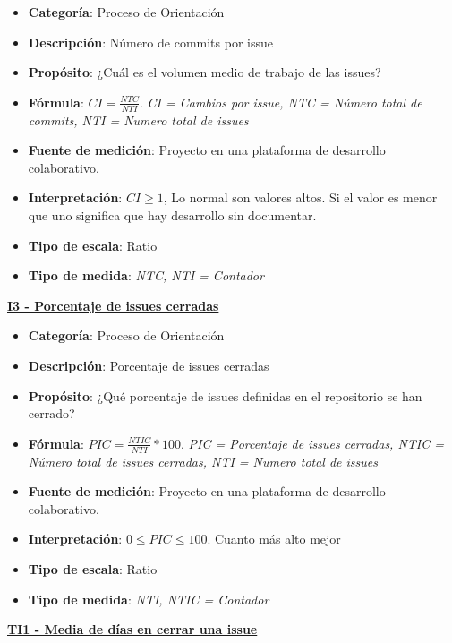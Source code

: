 \begin{itemize}
	\item \textbf{Categoría}: Proceso de Orientación
	\item \textbf{Descripción}: Número de commits por issue
	\item \textbf{Propósito}: ¿Cuál es el volumen medio de trabajo de las issues?
	\item \textbf{Fórmula}: $CI = \frac{NTC}{NTI}$. \textit{CI = Cambios por issue, NTC = Número total de commits, NTI = Numero total de issues}
	\item \textbf{Fuente de medición}: Proyecto en una plataforma de desarrollo colaborativo.
	\item \textbf{Interpretación}: $CI \geq 1$, Lo normal son valores altos. Si el valor es menor que uno significa que hay desarrollo sin documentar.
	\item \textbf{Tipo de escala}: Ratio 
	\item \textbf{Tipo de medida}: \textit{NTC, NTI = Contador}
\end{itemize}

\textbf{\underline{I3 - Porcentaje de issues cerradas}}

\begin{itemize}
	\item \textbf{Categoría}: Proceso de Orientación
	\item \textbf{Descripción}: Porcentaje de issues cerradas
	\item \textbf{Propósito}: ¿Qué porcentaje de issues definidas en el repositorio se han cerrado?
	\item \textbf{Fórmula}: $PIC = \frac{NTIC}{NTI}*100$. \textit{PIC = Porcentaje de issues cerradas, NTIC = Número total de issues cerradas, NTI = Numero total de issues}
	\item \textbf{Fuente de medición}: Proyecto en una plataforma de desarrollo colaborativo.
	\item \textbf{Interpretación}: $0 \leq PIC \leq 100$. Cuanto más alto mejor
	\item \textbf{Tipo de escala}: Ratio
	\item \textbf{Tipo de medida}: \textit{NTI, NTIC = Contador}
\end{itemize}

\textbf{\underline{TI1 - Media de días en cerrar una issue}}

